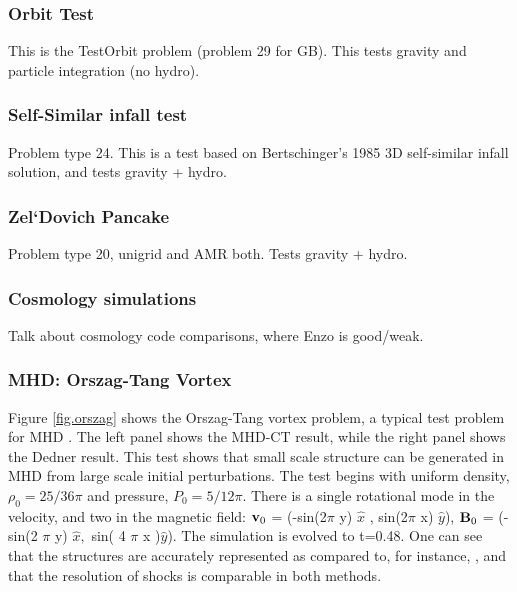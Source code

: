 \subsubsection{Orbit Test}
\label{sec.test.testorbit}
This is the TestOrbit problem (problem 29 for GB).  This tests gravity and particle integration (no hydro).

\subsubsection{Self-Similar infall test}
\label{sec.tests.infall}
Problem type 24.  This is a test based on Bertschinger's 1985 3D self-similar infall
solution, and tests gravity + hydro.

\subsubsection{Zel`Dovich Pancake}
\label{sec.tests.pancake}
Problem type 20, unigrid and AMR both.  Tests gravity + hydro.

\subsubsection{Cosmology simulations}
\label{sec.tests.}
Talk about cosmology code comparisons, where Enzo is good/weak.

\subsubsection{MHD: Orszag-Tang Vortex}
\label{sec.tests.mhd}
Figure \ref{fig.orszag} shows the Orszag-Tang vortex problem, a typical test
problem for MHD \citep{Orszag79}.  The left panel shows the MHD-CT result, while
the right panel shows the Dedner result.  This test shows that small scale structure
can be generated in MHD from large scale initial perturbations.  
The test begins 
with uniform density, $\rho_0=25/36 \pi$ and pressure, $P_0=5/12 \pi$.  There is
a single rotational mode in the velocity, and two in the magnetic field: 
${\bf v}_0 $ = (-sin(2$\pi$ y) $ \hat{x}$ , sin(2$\pi$ x) $\hat{y}$),
${\bf B}_0$  =  (-sin(2 $\pi$ y) $ \hat{x},$ sin( 4 $\pi$ x )$\hat{y}$).  The
simulation is evolved to t=0.48.  One can see that the structures are accurately
represented as compared to, for instance, \citet{Toth00}, and that the
resolution of shocks is comparable in both methods.  

